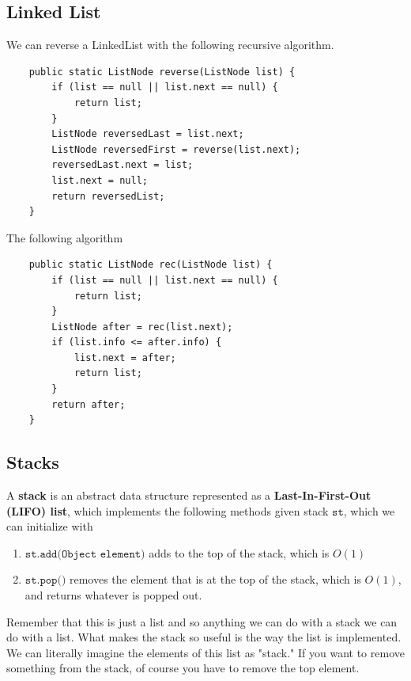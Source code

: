 \subsection{Linked List}

  \begin{example}[Reverse]
    We can reverse a LinkedList with the following recursive algorithm. 
    \begin{lstlisting}
    public static ListNode reverse(ListNode list) {
        if (list == null || list.next == null) {
            return list; 
        }
        ListNode reversedLast = list.next; 
        ListNode reversedFirst = reverse(list.next); 
        reversedLast.next = list; 
        list.next = null; 
        return reversedList; 
    }
    \end{lstlisting}
  \end{example}

  \begin{example}
    The following algorithm 
    \begin{lstlisting}
    public static ListNode rec(ListNode list) {
        if (list == null || list.next == null) {
            return list; 
        }
        ListNode after = rec(list.next); 
        if (list.info <= after.info) {
            list.next = after; 
            return list; 
        }
        return after; 
    }
    \end{lstlisting}
  \end{example}

\subsection{Stacks}

  \begin{definition}[Stack]
    A \textbf{stack} is an abstract data structure represented as a \textbf{Last-In-First-Out (LIFO) list}, which implements the following methods given stack $\texttt{st}$, which we can initialize with 
    \begin{enumerate}
      \item $\texttt{st.add(Object element)}$ adds to the top of the stack, which is $O(1)$ 
      \item $\texttt{st.pop()}$ removes the element that is at the top of the stack, which is $O(1)$, and returns whatever is popped out. 
    \end{enumerate}
    Remember that this is just a list and so anything we can do with a stack we can do with a list. What makes the stack so useful is the way the list is implemented. We can literally imagine the elements of this list as "stack." If you want to remove something from the stack, of course you have to remove the top element. 
  \end{definition}

